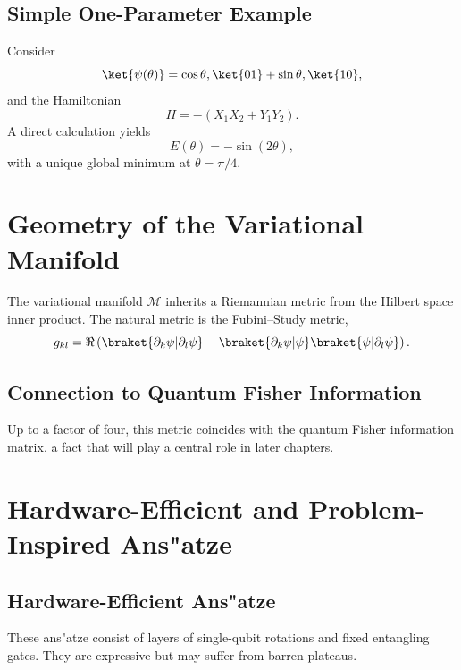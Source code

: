 \documentclass{book}
\begin{document}
\subsection{Simple One-Parameter Example}

Consider
\begin{equation}
\ket{\psi(\theta)} = \cos\theta , \ket{01} + \sin\theta , \ket{10},
\end{equation}
and the Hamiltonian
\begin{equation}
H = - (X_1 X_2 + Y_1 Y_2).
\end{equation}
A direct calculation yields
\begin{equation}
E(\theta) = - \sin(2\theta),
\end{equation}
with a unique global minimum at $\theta = \pi/4$.

\section{Geometry of the Variational Manifold}

The variational manifold $\mathcal{M}$ inherits a Riemannian metric from the Hilbert space inner product. The natural metric is the Fubini--Study metric,
\begin{equation}
g_{kl} = \Re \left( \braket{\partial_k \psi | \partial_l \psi} - \braket{\partial_k \psi | \psi} \braket{\psi | \partial_l \psi} \right).
\end{equation}

\subsection{Connection to Quantum Fisher Information}

Up to a factor of four, this metric coincides with the quantum Fisher information matrix, a fact that will play a central role in later chapters.

\section{Hardware-Efficient and Problem-Inspired Ans"atze}

\subsection{Hardware-Efficient Ans"atze}

These ans"atze consist of layers of single-qubit rotations and fixed entangling gates. They are expressive but may suffer from barren plateaus.
\end{document}
